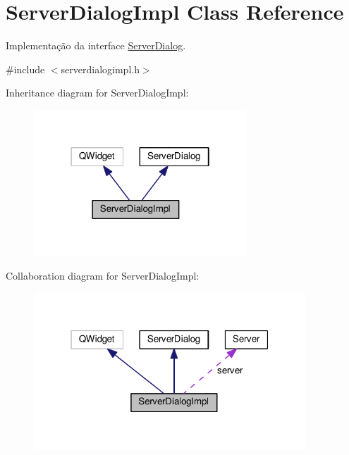 \hypertarget{classServerDialogImpl}{}\section{Server\+Dialog\+Impl Class Reference}
\label{classServerDialogImpl}


Implementação da interface \hyperlink{classServerDialog}{Server\+Dialog}.  




{\ttfamily \#include $<$serverdialogimpl.\+h$>$}



Inheritance diagram for Server\+Dialog\+Impl\+:\nopagebreak
\begin{figure}[H]
\begin{center}
\leavevmode
\includegraphics[width=226pt]{d1/da5/classServerDialogImpl__inherit__graph}
\end{center}
\end{figure}


Collaboration diagram for Server\+Dialog\+Impl\+:\nopagebreak
\begin{figure}[H]
\begin{center}
\leavevmode
\includegraphics[width=289pt]{d3/d6b/classServerDialogImpl__coll__graph}
\end{center}
\end{figure}

